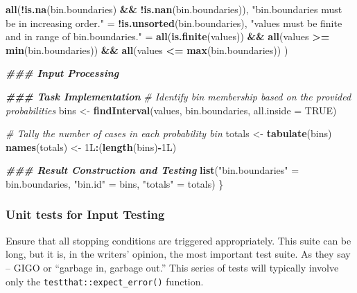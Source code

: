 \documentclass[
]{book}
\newenvironment{Shaded}{\begin{snugshade}}{\end{snugshade}}
\newcommand{\AttributeTok}[1]{\textcolor[rgb]{0.13,0.29,0.53}{#1}}
\newcommand{\CommentTok}[1]{\textcolor[rgb]{0.56,0.35,0.01}{\textit{#1}}}
\newcommand{\ConstantTok}[1]{\textcolor[rgb]{0.56,0.35,0.01}{#1}}
\newcommand{\DocumentationTok}[1]{\textcolor[rgb]{0.56,0.35,0.01}{\textbf{\textit{#1}}}}
\newcommand{\FunctionTok}[1]{\textcolor[rgb]{0.13,0.29,0.53}{\textbf{#1}}}
\newcommand{\NormalTok}[1]{#1}
\newcommand{\OtherTok}[1]{\textcolor[rgb]{0.56,0.35,0.01}{#1}}
\newcommand{\SpecialCharTok}[1]{\textcolor[rgb]{0.81,0.36,0.00}{\textbf{#1}}}
\newcommand{\StringTok}[1]{\textcolor[rgb]{0.31,0.60,0.02}{#1}}
\begin{document}
\begin{Shaded}
\begin{Highlighting}[]
      \FunctionTok{all}\NormalTok{(}\SpecialCharTok{!}\FunctionTok{is.na}\NormalTok{(bin.boundaries) }\SpecialCharTok{\&\&} \SpecialCharTok{!}\FunctionTok{is.nan}\NormalTok{(bin.boundaries)),}
    \StringTok{"\textasciigrave{}bin.boundaries\textasciigrave{} must be in increasing order."} \OtherTok{=} \SpecialCharTok{!}\FunctionTok{is.unsorted}\NormalTok{(bin.boundaries),}
    \StringTok{"\textasciigrave{}values\textasciigrave{} must be finite and in range of \textasciigrave{}bin.boundaries\textasciigrave{}."} \OtherTok{=} 
      \FunctionTok{all}\NormalTok{(}\FunctionTok{is.finite}\NormalTok{(values)) }\SpecialCharTok{\&\&} \FunctionTok{all}\NormalTok{(values }\SpecialCharTok{\textgreater{}=} \FunctionTok{min}\NormalTok{(bin.boundaries)) }\SpecialCharTok{\&\&} 
      \FunctionTok{all}\NormalTok{(values }\SpecialCharTok{\textless{}=} \FunctionTok{max}\NormalTok{(bin.boundaries))}
\NormalTok{  )}
  
  \DocumentationTok{\#\#\# Input Processing}
  
  \DocumentationTok{\#\#\# Task Implementation}
  \CommentTok{\# Identify bin membership based on the provided probabilities}
\NormalTok{  bins }\OtherTok{\textless{}{-}} \FunctionTok{findInterval}\NormalTok{(values, bin.boundaries, }\AttributeTok{all.inside =} \ConstantTok{TRUE}\NormalTok{)}
  
  \CommentTok{\# Tally the number of cases in each probability bin}
\NormalTok{  totals }\OtherTok{\textless{}{-}} \FunctionTok{tabulate}\NormalTok{(bins)}
  \FunctionTok{names}\NormalTok{(totals) }\OtherTok{\textless{}{-}}\NormalTok{ 1L}\SpecialCharTok{:}\NormalTok{(}\FunctionTok{length}\NormalTok{(bins)}\SpecialCharTok{{-}}\NormalTok{1L)}
  
  \DocumentationTok{\#\#\# Result Construction and Testing}
  \FunctionTok{list}\NormalTok{(}\StringTok{"bin.boundaries"}  \OtherTok{=}\NormalTok{ bin.boundaries, }
       \StringTok{"bin.id"}          \OtherTok{=}\NormalTok{ bins, }
       \StringTok{"totals"}          \OtherTok{=}\NormalTok{ totals)}
\NormalTok{\}}
\end{Highlighting}
\end{Shaded}

\hypertarget{unit-tests-for-input-testing}{%
\subsubsection{Unit tests for Input Testing}\label{unit-tests-for-input-testing}}

Ensure that all stopping conditions are triggered appropriately. This suite can be long, but it is, in the writers' opinion, the most important test suite. As they say -- GIGO or ``garbage in, garbage out.'' This series of tests will typically involve only the \texttt{testthat::expect\_error()} function.
\end{document}
